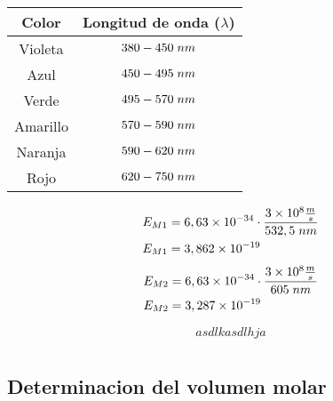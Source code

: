 \documentclass[12pt]{report}
\begin{document}
\begin{table}[h!]
  \centering
  \begin{tabular}{|c|c|}
    \hline
    Color & Longitud de onda ($\lambda$)\\
    \hline
    Violeta & $380-450\hspace{1mm}nm$ \\
    \hline
    Azul & $450-495\hspace{1mm} nm$ \\
    \hline
    Verde & $495-570\hspace{1mm} nm$ \\
    \hline
    Amarillo & $570-590\hspace{1mm} nm$ \\
    \hline
    Naranja & $590-620\hspace{1mm} nm$ \\
    \hline
    Rojo & $620-750\hspace{1mm} nm$ \\
    \hline
  \end{tabular}
\end{table}

\begin{minipage}[t]{0.48\textwidth}
  $$
  \begin{aligned}
    E_{M1}&=6,63\times10^{-34}\cdot \frac{3\times10^8 \frac{m}{s} }{532,5\hspace{1mm}nm}\\
    E_{M1}&=3,862\times10^{-19}
  \end{aligned}
  $$
  \vspace{5mm}
  $$
  \begin{aligned}
    E_{M2}&=6,63\times10^{-34}\cdot \frac{3\times10^8 \frac{m}{s} }{ 605 \hspace{1mm}nm}\\
    E_{M2}&= 3,287 \times10^{-19}
  \end{aligned}
  $$
\end{minipage}
\hfill
\begin{minipage}[t]{0.48\textwidth}
  $$asdlkasdlhja$$
\end{minipage}

\chapter{}
\section{Determinacion del volumen molar}
\end{document}
